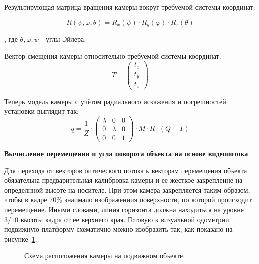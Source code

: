 Результирующая матрица вращения камеры вокруг требуемой системы координат:

$$ R(\psi , \varphi , \theta ) = R_x(\psi ) \cdot R_y(\varphi ) \cdot R_z(\theta ) $$

, где $ \theta , \varphi , \psi $ - углы Эйлера.

Вектор смещения камеры относительно требуемой системы координат:
$$ 
T = 
\left( 
\begin{array}{c}
t_x \\ 
t_y \\ 
t_z
\end{array} 
\right) 
$$ 

Теперь модель камеры с учётом радиального искажения и погрешностей установки выглядит так\cite{cameraCalibrate}:
$$
q = \frac{1}{Z} \cdot \left( 
\begin{array}{ccc}
	\lambda & 0 & 0 \\ 
	0 & \lambda & 0 \\ 
	0 & 0 & 1
\end{array} 
\right) 
 \cdot M \cdot R \cdot (Q + T)
$$

\textbf{Вычисление перемещения и угла поворота объекта на основе видеопотока}

Для перехода от векторов оптического потока к векторам перемещения объекта обязательна предварительная калибровка камеры и ее жесткое закреплеине на определнной высоте на носителе. При этом камера закрепляется таким образом, чтобы в кадре 70\% знаимало изображениия поверхности, по которой происходит перемещение. Иными словами, линия горизонта должна находиться на уровне $3/10$ высоты кадра от ее верхнего края. Готовую к визуальной одометрии подвижную платформу схематично можно изобразить так, как показано на рисунке~\ref{pic:objectsSchema}.

\begin{figure}[!h]
\caption{Схема расположения камеры на подвижном объекте.}
\label{pic:objectsSchema}
\end{figure}

